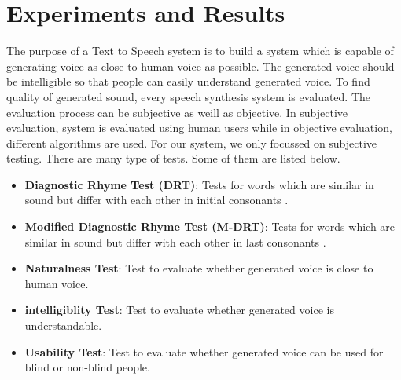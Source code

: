 \chapter{Experiments and Results}

The purpose of a Text to Speech system is to build a system which is capable of generating voice as close to human voice as possible. 
The generated voice should be intelligible so that people can easily understand generated voice. To find quality of generated sound, every speech synthesis 
system is evaluated. The evaluation process can be subjective as weill as objective. In subjective evaluation, system is evaluated using human users while in objective 
evaluation, different algorithms are used. For our system, we only focussed on subjective testing. There are many type of tests. Some of them are listed below.

\begin{itemize}
  \item{\textbf{Diagnostic Rhyme Test (DRT)}:} Tests for words which are similar in sound but differ with each other in initial consonants \cite{voiers1977diagnostic}.
  \item{\textbf{Modified Diagnostic Rhyme Test (M-DRT)}:} Tests for words which are similar in sound but differ with each other in last consonants \cite{house1965articulation}.
  \item{\textbf{Naturalness Test}:} Test to evaluate whether generated voice is close to human voice.
  \item{\textbf{intelligiblity Test}:} Test to evaluate whether generated voice is understandable.
  \item{\textbf{Usability Test}:} Test to evaluate whether generated voice can be used for blind or non-blind people.
\end{itemize}